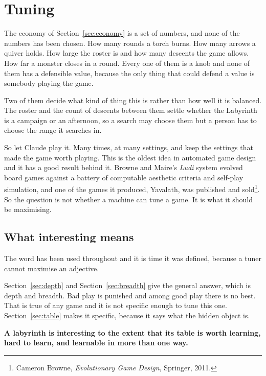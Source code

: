 \documentclass[11pt,a4paper]{article}
\begin{document}
\section{Tuning}
\label{sec:tune}

The economy of Section~\ref{sec:economy} is a set of numbers, and none of the numbers has been
chosen. How many rounds a torch burns. How many arrows a quiver holds. How large the roster is
and how many descents the game allows. How far a monster closes in a round. Every one of them is a
knob and none of them has a defensible value, because the only thing that could defend a value is
somebody playing the game.

Two of them decide what kind of thing this is rather than how well it is balanced. The roster and
the count of descents between them settle whether the Labyrinth is a campaign or an afternoon, so
a search may choose them but a person has to choose the range it searches in.

So let Claude play it. Many times, at many settings, and keep the settings that made the game
worth playing. This is the oldest idea in automated game design and it has a good result behind
it. Browne and Maire's \emph{Ludi} system evolved board games against a battery of computable
aesthetic criteria and self-play simulation, and one of the games it produced, Yavalath, was
published and sold\footnote{Cameron Browne, \emph{Evolutionary Game Design}, Springer, 2011.}. So
the question is not whether a machine can tune a game. It is what it should be maximising.

\subsection{What interesting means}
\label{sec:define}

The word has been used throughout and it is time it was defined, because a tuner cannot maximise an
adjective.

Section~\ref{sec:depth} and Section~\ref{sec:breadth} give the general answer, which is depth and
breadth. Bad play is punished and among good play there is no best. That is true of any game and it
is not specific enough to tune this one. Section~\ref{sec:table} makes it specific, because it says
what the hidden object is.

\begin{sectionbox}
\textbf{A labyrinth is interesting to the extent that its table is worth learning, hard to learn,
and learnable in more than one way.}
\end{sectionbox}
\end{document}
